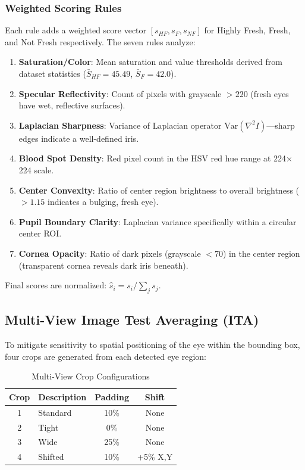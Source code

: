 \documentclass[conference]{IEEEtran}
\begin{document}
\subsubsection{Weighted Scoring Rules}
Each rule adds a weighted score vector $[s_{HF}, s_F, s_{NF}]$ for Highly Fresh, Fresh, and Not Fresh respectively. The seven rules analyze:

\begin{enumerate}[leftmargin=*]
    \item \textbf{Saturation/Color}: Mean saturation and value thresholds derived from dataset statistics ($\bar{S}_{HF} = 45.49$, $\bar{S}_{F} = 42.0$).
    \item \textbf{Specular Reflectivity}: Count of pixels with grayscale $> 220$ (fresh eyes have wet, reflective surfaces).
    \item \textbf{Laplacian Sharpness}: Variance of Laplacian operator $\text{Var}(\nabla^2 I)$---sharp edges indicate a well-defined iris.
    \item \textbf{Blood Spot Density}: Red pixel count in the HSV red hue range at 224$\times$224 scale.
    \item \textbf{Center Convexity}: Ratio of center region brightness to overall brightness ($>1.15$ indicates a bulging, fresh eye).
    \item \textbf{Pupil Boundary Clarity}: Laplacian variance specifically within a circular center ROI.
    \item \textbf{Cornea Opacity}: Ratio of dark pixels (grayscale $< 70$) in the center region (transparent cornea reveals dark iris beneath).
\end{enumerate}

Final scores are normalized: $\hat{s}_i = s_i / \sum_{j} s_j$.

\subsection{Multi-View Image Test Averaging (ITA)}

To mitigate sensitivity to spatial positioning of the eye within the bounding box, four crops are generated from each detected eye region:

\begin{table}[h]
\centering
\caption{Multi-View Crop Configurations}
\label{tab:crops}
\begin{tabular}{clcc}
\toprule
\textbf{Crop} & \textbf{Description} & \textbf{Padding} & \textbf{Shift} \\
\midrule
1 & Standard & 10\% & None \\
2 & Tight & 0\% & None \\
3 & Wide & 25\% & None \\
4 & Shifted & 10\% & +5\% X,Y \\
\bottomrule
\end{tabular}
\end{table}
\end{document}
